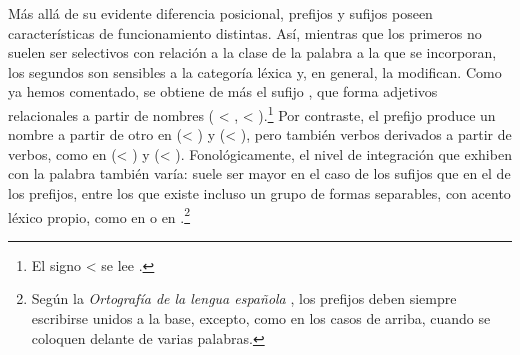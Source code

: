 Más allá de su evidente diferencia posicional, prefijos y sufijos poseen
características de funcionamiento distintas. Así, mientras que los primeros no
suelen ser selectivos con relación a la clase de la palabra a la que se
incorporan, los segundos son sensibles a la categoría léxica y, en general, la
modifican. Como ya hemos comentado,  se obtiene de  más
el sufijo , que forma adjetivos relacionales a partir de nombres
( < ,  < ).\footnote{El signo <
se lee .} Por contraste, el prefijo  produce un
nombre a partir de otro en  (< ) y
 (< ), pero también verbos derivados a partir
de verbos, como en  (< ) y 
(< ). Fonológicamente, el nivel de integración que exhiben con
la palabra también varía: suele ser mayor en el caso de los sufijos que en el de
los prefijos, entre los que existe incluso un grupo de formas separables, con
acento léxico propio, como  en  o
 en .\footnote{Según la \textit{Ortografía de la
lengua española} \parencite[cap.~V, §\,2.2.2]{rae2010}, los prefijos deben
siempre escribirse unidos a la base, excepto, como en los casos de arriba,
cuando se coloquen delante de varias palabras.}

